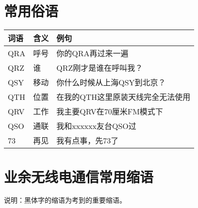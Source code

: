 \newpage

\section{常用俗语}

\begin{longtable}{|l|l|l|}
	\hline
	\textbf{词语} & \textbf{含义} & \textbf{例句}        \\
	\hline
	QRA         & 呼号          & 你的QRA再过来一遍         \\
	\hline
	QRZ         & 谁           & QRZ刚才是谁在呼叫我？       \\
	\hline
	QSY         & 移动          & 你什么时候从上海QSY到北京？    \\
	\hline
	QTH         & 位置          & 在我的QTH这里原装天线完全无法使用 \\
	\hline
	QRV         & 工作          & 我主要QRV在70厘米FM模式下   \\
	\hline
	QSO         & 通联          & 我和xxxxxx友台QSO过     \\
	\hline
	73          & 再见          & 我有点事，先73了          \\
	\hline
\end{longtable}

\newpage

\section{业余无线电通信常用缩语}

说明：黑体字的缩语为考到的重要缩语。

